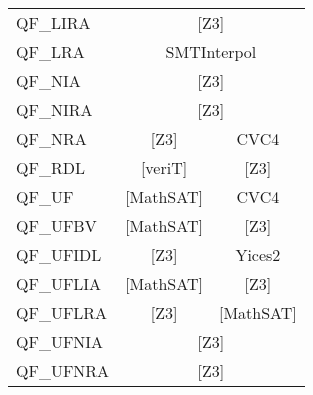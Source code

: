 \begin{table}[]
\begin{center}
{\begin{tabular}{lccc}
\multicolumn{1}{l|}{QF\_LIRA}   & \multicolumn{3}{c|}{{[}Z3{]}}                                                                                     \\ \cline{2-4} 
\multicolumn{1}{l|}{QF\_LRA}    & \multicolumn{3}{c|}{SMTInterpol}                                                                                  \\ \cline{2-4} 
\multicolumn{1}{l|}{QF\_NIA}    & \multicolumn{3}{c|}{{[}Z3{]}}                                                                                     \\ \cline{2-4} 
\multicolumn{1}{l|}{QF\_NIRA}   & \multicolumn{3}{c|}{{[}Z3{]}}                                                                                     \\ \cline{2-4} 
\multicolumn{1}{l|}{QF\_NRA}    & \multicolumn{1}{c|}{{[}Z3{]}}      & \multicolumn{2}{c|}{CVC4}                                                    \\ \cline{2-4} 
\multicolumn{1}{l|}{QF\_RDL}    & \multicolumn{1}{c|}{{[}veriT{]}}   & \multicolumn{2}{c|}{{[}Z3{]}}                                                \\ \cline{2-4} 
\multicolumn{1}{l|}{QF\_UF}     & \multicolumn{1}{c|}{{[}MathSAT{]}} & \multicolumn{2}{c|}{CVC4}                                                    \\ \cline{2-4} 
\multicolumn{1}{l|}{QF\_UFBV}   & \multicolumn{2}{c|}{{[}MathSAT{]}}                                             & \multicolumn{1}{c|}{{[}Z3{]}}    \\ \cline{2-4} 
\multicolumn{1}{l|}{QF\_UFIDL}  & \multicolumn{2}{c|}{{[}Z3{]}}                                                  & \multicolumn{1}{c|}{Yices2}      \\ \cline{2-4} 
\multicolumn{1}{l|}{QF\_UFLIA}  & \multicolumn{1}{c|}{{[}MathSAT{]}} & \multicolumn{2}{c|}{{[}Z3{]}}                                                \\ \cline{2-4} 
\multicolumn{1}{l|}{QF\_UFLRA}  & \multicolumn{1}{c|}{{[}Z3{]}}      & \multicolumn{2}{c}{{[}MathSAT{]}}                                            \\ \cline{2-4} 
\multicolumn{1}{l|}{QF\_UFNIA}  & \multicolumn{3}{c|}{{[}Z3{]}}                                                                                     \\ \cline{2-4} 
\multicolumn{1}{l|}{QF\_UFNRA}  & \multicolumn{3}{c|}{{[}Z3{]}}                                                                                     \\ \cline{2-4} 

\end{tabular}}
\end{center}
\end{table}
